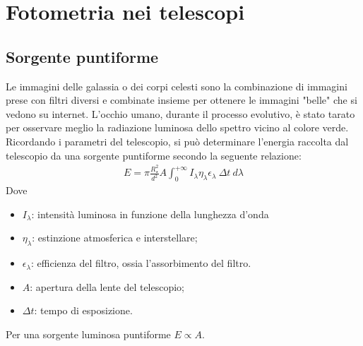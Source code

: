 \documentclass[a4paper, oneside]{book}
\begin{document}
\section{Fotometria nei telescopi}
\subsection{Sorgente puntiforme}
\begin{figure}
    \centering
\end{figure}
Le immagini delle galassia o dei corpi celesti sono la combinazione di 
immagini prese con filtri diversi e combinate insieme per ottenere le immagini
"belle" che si vedono su internet. L'occhio umano, durante il processo evolutivo, è stato
tarato per osservare meglio la radiazione luminosa dello spettro vicino al colore verde.
Ricordando i parametri del telescopio, si può determinare l'energia 
raccolta dal telescopio da una sorgente puntiforme secondo la seguente relazione:
\begin{align}
    E = \pi \frac{R_{\star}^{2} }{d^{2} }A \int_{0}^{+\infty }I_{\lambda}\eta_\lambda\epsilon_\lambda \  \Delta t  \ d\lambda
\end{align}
Dove 
\begin{itemize}
    \item $I_{\lambda}$: intensità luminosa in funzione della lunghezza d'onda
    \item $\eta_\lambda$: estinzione atmosferica e interstellare;
    \item $\epsilon_\lambda$: efficienza del filtro, ossia l'assorbimento del filtro.
    \item $A$: apertura della lente del telescopio;
    \item $\Delta t$: tempo di esposizione.
\end{itemize}
Per una sorgente luminosa puntiforme $E \propto A$. 
\end{document}
